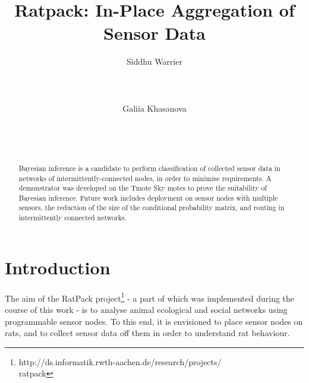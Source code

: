 \documentclass{sig-alternate-10pt}
\begin{document}
\title{{\ttlit Ratpack}: In-Place Aggregation of Sensor Data 
}

\author{ 
\alignauthor
Siddhu Warrier \\
\\
\\
\\
\alignauthor
Galiia Khasanova \\
\\
\\
\\
}

\maketitle
\begin{abstract}
Bayesian inference is a candidate to perform classification of collected sensor data in networks of intermittently-connected nodes, in order to minimise requirements. A demonstrator was developed on the Tmote Sky motes to prove the suitability of Bayesian inference. Future work includes deployment on sensor nodes with multiple sensors, the reduction of the size of the conditional probability matrix, and routing in intermittently connected networks.
\end{abstract}




\section{Introduction}

The aim of the RatPack
project\footnote{http://ds.informatik.rwth-aachen.de/research/projects/\\ratpack} -
a part of which was implemented during the course of this work - is to analyse
animal ecological and social networks using programmable sensor nodes. To this
end, it is envisioned to place sensor nodes on rats, and to collect sensor data
off them in order to understand rat behaviour. 
\end{document}
